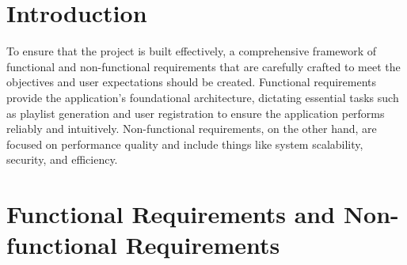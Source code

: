 \section{Introduction}
To ensure that the project is built effectively, a comprehensive framework of functional and non-functional requirements that are carefully crafted to meet the objectives and user expectations should be created.
Functional requirements provide the application's foundational architecture, dictating essential tasks such as playlist generation and user registration to ensure the application performs reliably and intuitively.
Non-functional requirements, on the other hand, are focused on performance quality and include things like system scalability, security, and efficiency.
\section{Functional Requirements and Non-functional Requirements}
